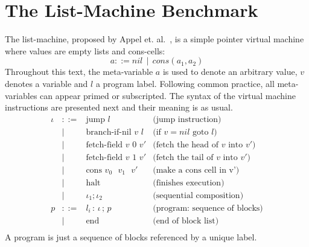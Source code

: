 \documentclass[review]{elsarticle}
\theoremstyle{definition}
\begin{document}




\section{The List-Machine Benchmark}\label{sec:list}

The list-machine, proposed by Appel et. al.~\cite{AppelDL12}, is a simple pointer virtual machine where values
are empty lists and cons-cells:
\[
a ::= nil\,\mid\,cons(a_1,a_2)
\]
Throughout this text, the meta-variable $a$ is used to denote an arbitrary value, $v$ denotes a variable
and $l$ a program label. Following common practice, all meta-variables can
appear primed or subscripted. The syntax of the virtual machine instructions are
presented next and their meaning is as usual.
\[
\begin{array}{rcll}
  \iota & ::=  & \text{jump }l                       & \text{(jump instruction)}\\
        & \mid & \text{branch-if-nil $v$~$l$}            & \text{(if $v = nil$ goto $l$)}\\
        & \mid & \text{fetch-field $v$ 0 $v'$}       & \text{(fetch the head of $v$ into $v'$)}\\
        & \mid & \text{fetch-field  $v$ 1 $v'$}      & \text{(fetch the tail of $v$ into $v'$)}\\
        & \mid & \text{cons $v_0$ $v_1$ $v'$}        & \text{(make a cons cell in v')} \\
        & \mid & \text{halt}                         & \text{(finishes execution)}\\
        & \mid & \iota_1;\iota_2                             & \text{(sequential composition)}\\
      p & ::=  & l_i \,:\,\iota\,;\,p                    & \text{(program: sequence of blocks)}\\
        & \mid & \text{end}                          & \text{(end of block list)}\\
\end{array}
\]
A program is just a sequence of blocks referenced by a unique label.
\end{document}
